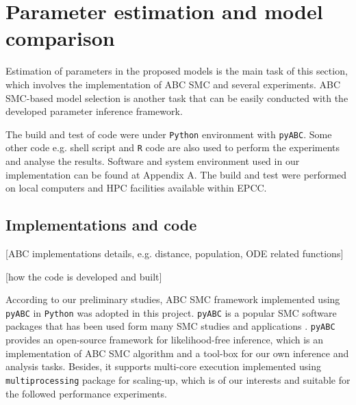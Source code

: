 \documentclass[12pt,a4paper]{report}
\begin{document}









\chapter{Parameter estimation and model comparison}

Estimation of  parameters in the proposed models is the main task of this section, which involves the implementation of ABC SMC and several experiments. ABC SMC-based model selection is another task that can be easily conducted with the developed parameter inference framework.

The build and test of code were under \verb|Python| environment with \verb|pyABC|\cite{ref:pyabc}. Some other code e.g. shell script and \verb|R| code are also used to perform the experiments and analyse the results. Software and system environment used in our implementation can be found at Appendix A. The build and test were performed on local computers and HPC facilities available within EPCC.






\section{Implementations and code}

[ABC implementations details, e.g. distance, population, ODE related functions]

[how the code is developed and built]

According to our preliminary studies, ABC SMC framework implemented using \verb|pyABC| in \verb|Python| was adopted in this project. \verb|pyABC| is a popular SMC software packages \cite{ref:pyabc} that has been used form many SMC studies and applications \cite{ref:adpt_pop}. \verb|pyABC| provides an open-source framework for likelihood-free inference, which is an implementation of ABC SMC algorithm and a tool-box for our own inference and analysis tasks. Besides, it supports multi-core execution implemented using \verb|multiprocessing| package for scaling-up, which is of our interests and suitable for the followed performance experiments.
\end{document}
